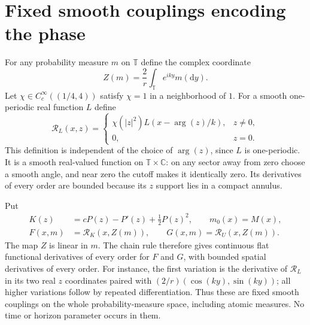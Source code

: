 \documentclass[11pt]{article}
\newcommand{\T}{\mathbb T}
\newcommand{\dd}{\mathrm d}
\begin{document}
\section{Fixed smooth couplings encoding the phase}
For any probability measure $m$ on $\T$ define the complex coordinate
\[
 Z(m)=\frac2r\int_\T e^{iky}m(\dd y).
\]
Let $\chi\in C_c^\infty((1/4,4))$ satisfy $\chi=1$ in a neighborhood of $1$. For a smooth one-periodic real function $L$ define
\[
 \mathcal R_L(x,z)=
 \begin{cases}
 \chi(|z|^2)L(x-\arg(z)/k),&z\ne0,\\
 0,&z=0.
 \end{cases}
\]
This definition is independent of the choice of $\arg(z)$, since $L$ is one-periodic. It is a smooth real-valued function on $\T\times\mathbb C$: on any sector away from zero choose a smooth angle, and near zero the cutoff makes it identically zero. Its derivatives of every order are bounded because its $z$ support lies in a compact annulus.

Put
\begin{equation}\label{couplings}
 \begin{split}
 K(z)&=cP(z)-P'(z)+\tfrac12P(z)^2,\qquad m_0(x)=M(x),\\
 F(x,m)&=\mathcal R_K(x,Z(m)),\qquad G(x,m)=\mathcal R_U(x,Z(m)).
 \end{split}
\end{equation}
The map $Z$ is linear in $m$. The chain rule therefore gives continuous flat functional derivatives of every order for $F$ and $G$, with bounded spatial derivatives of every order. For instance, the first variation is the derivative of $\mathcal R_L$ in its two real $z$ coordinates paired with
$(2/r)(\cos(ky),\sin(ky))$; all higher variations follow by repeated differentiation. Thus these are fixed smooth couplings on the whole probability-measure space, including atomic measures. No time or horizon parameter occurs in them.
\end{document}
